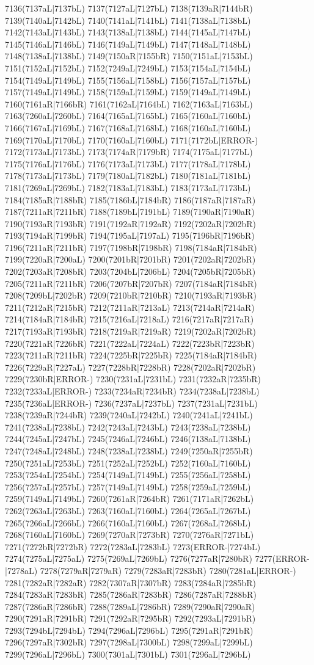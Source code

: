 7136(7137aL|7137bL) 7137(7127aL|7127bL) 7138(7139aR|7144bR) 7139(7140aL|7142bL) 7140(7141aL|7141bL) 7141(7138aL|7138bL) 7142(7143aL|7143bL) 7143(7138aL|7138bL) 7144(7145aL|7147bL) 7145(7146aL|7146bL) 7146(7149aL|7149bL) 7147(7148aL|7148bL) 7148(7138aL|7138bL) 7149(7150aR|7155bR) 7150(7151aL|7153bL) 7151(7152aL|7152bL) 7152(7249aL|7249bL) 7153(7154aL|7154bL) 7154(7149aL|7149bL) 7155(7156aL|7158bL) 7156(7157aL|7157bL) 7157(7149aL|7149bL) 7158(7159aL|7159bL) 7159(7149aL|7149bL) 7160(7161aR|7166bR) 7161(7162aL|7164bL) 7162(7163aL|7163bL) 7163(7260aL|7260bL) 7164(7165aL|7165bL) 7165(7160aL|7160bL) 7166(7167aL|7169bL) 7167(7168aL|7168bL) 7168(7160aL|7160bL) 7169(7170aL|7170bL) 7170(7160aL|7160bL) 7171(7172bL|ERROR-) 7172(7173aL|7173bL) 7173(7174aR|7179bR) 7174(7175aL|7177bL) 7175(7176aL|7176bL) 7176(7173aL|7173bL) 7177(7178aL|7178bL) 7178(7173aL|7173bL) 7179(7180aL|7182bL) 7180(7181aL|7181bL) 7181(7269aL|7269bL) 7182(7183aL|7183bL) 7183(7173aL|7173bL) 7184(7185aR|7188bR) 7185(7186bL|7184bR) 7186(7187aR|7187aR) 7187(7211aR|7211bR) 7188(7189bL|7191bL) 7189(7190aR|7190aR) 7190(7193aR|7193bR) 7191(7192aR|7192aR) 7192(7202aR|7202bR) 7193(7194aR|7199bR) 7194(7195aL|7197aL) 7195(7196bR|7196bR) 7196(7211aR|7211bR) 7197(7198bR|7198bR) 7198(7184aR|7184bR) 7199(7220aR|7200aL) 7200(7201bR|7201bR) 7201(7202aR|7202bR) 7202(7203aR|7208bR) 7203(7204bL|7206bL) 7204(7205bR|7205bR) 7205(7211aR|7211bR) 7206(7207bR|7207bR) 7207(7184aR|7184bR) 7208(7209bL|7202bR) 7209(7210bR|7210bR) 7210(7193aR|7193bR) 7211(7212aR|7215bR) 7212(7211aR|7213aL) 7213(7214aR|7214aR) 7214(7184aR|7184bR) 7215(7216aL|7218aL) 7216(7217aR|7217aR) 7217(7193aR|7193bR) 7218(7219aR|7219aR) 7219(7202aR|7202bR) 7220(7221aR|7226bR) 7221(7222aL|7224aL) 7222(7223bR|7223bR) 7223(7211aR|7211bR) 7224(7225bR|7225bR) 7225(7184aR|7184bR) 7226(7229aR|7227aL) 7227(7228bR|7228bR) 7228(7202aR|7202bR) 7229(7230bR|ERROR-) 7230(7231aL|7231bL) 7231(7232aR|7235bR) 7232(7233aL|ERROR-) 7233(7234aR|7234bR) 7234(7238aL|7238bL) 7235(7236aL|ERROR-) 7236(7237aL|7237bL) 7237(7231aL|7231bL) 7238(7239aR|7244bR) 7239(7240aL|7242bL) 7240(7241aL|7241bL) 7241(7238aL|7238bL) 7242(7243aL|7243bL) 7243(7238aL|7238bL) 7244(7245aL|7247bL) 7245(7246aL|7246bL) 7246(7138aL|7138bL) 7247(7248aL|7248bL) 7248(7238aL|7238bL) 7249(7250aR|7255bR) 7250(7251aL|7253bL) 7251(7252aL|7252bL) 7252(7160aL|7160bL) 7253(7254aL|7254bL) 7254(7149aL|7149bL) 7255(7256aL|7258bL) 7256(7257aL|7257bL) 7257(7149aL|7149bL) 7258(7259aL|7259bL) 7259(7149aL|7149bL) 7260(7261aR|7264bR) 7261(7171aR|7262bL) 7262(7263aL|7263bL) 7263(7160aL|7160bL) 7264(7265aL|7267bL) 7265(7266aL|7266bL) 7266(7160aL|7160bL) 7267(7268aL|7268bL) 7268(7160aL|7160bL) 7269(7270aR|7273bR) 7270(7276aR|7271bL) 7271(7272bR|7272bR) 7272(7283aL|7283bL) 7273(ERROR-|7274bL) 7274(7275aL|7275aL) 7275(7269aL|7269bL) 7276(7277aR|7280bR) 7277(ERROR-|7278aL) 7278(7279aR|7279aR) 7279(7283aR|7283bR) 7280(7281aL|ERROR-) 7281(7282aR|7282aR) 7282(7307aR|7307bR) 7283(7284aR|7285bR) 7284(7283aR|7283bR) 7285(7286aR|7283bR) 7286(7287aR|7288bR) 7287(7286aR|7286bR) 7288(7289aL|7286bR) 7289(7290aR|7290aR) 7290(7291aR|7291bR) 7291(7292aR|7295bR) 7292(7293aL|7291bR) 7293(7294bL|7294bL) 7294(7296aL|7296bL) 7295(7291aR|7291bR) 7296(7297aR|7302bR) 7297(7298aL|7300bL) 7298(7299aL|7299bL) 7299(7296aL|7296bL) 7300(7301aL|7301bL) 7301(7296aL|7296bL) 